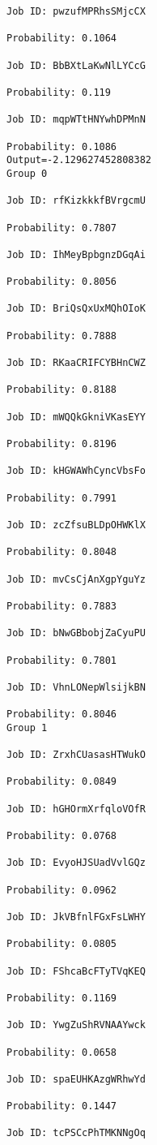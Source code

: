 \documentclass[11pt]{article}
\begin{document}
\begin{Verbatim}[commandchars=\\\{\}]
Job ID: pwzufMPRhsSMjcCX

Probability: 0.1064

Job ID: BbBXtLaKwNlLYCcG

Probability: 0.119

Job ID: mqpWTtHNYwhDPMnN

Probability: 0.1086
Output=-2.129627452808382
Group 0

Job ID: rfKizkkkfBVrgcmU

Probability: 0.7807

Job ID: IhMeyBpbgnzDGqAi

Probability: 0.8056

Job ID: BriQsQxUxMQhOIoK

Probability: 0.7888

Job ID: RKaaCRIFCYBHnCWZ

Probability: 0.8188

Job ID: mWQQkGkniVKasEYY

Probability: 0.8196

Job ID: kHGWAWhCyncVbsFo

Probability: 0.7991

Job ID: zcZfsuBLDpOHWKlX

Probability: 0.8048

Job ID: mvCsCjAnXgpYguYz

Probability: 0.7883

Job ID: bNwGBbobjZaCyuPU

Probability: 0.7801

Job ID: VhnLONepWlsijkBN

Probability: 0.8046
Group 1

Job ID: ZrxhCUasasHTWukO

Probability: 0.0849

Job ID: hGHOrmXrfqloVOfR

Probability: 0.0768

Job ID: EvyoHJSUadVvlGQz

Probability: 0.0962

Job ID: JkVBfnlFGxFsLWHY

Probability: 0.0805

Job ID: FShcaBcFTyTVqKEQ

Probability: 0.1169

Job ID: YwgZuShRVNAAYwck

Probability: 0.0658

Job ID: spaEUHKAzgWRhwYd

Probability: 0.1447

Job ID: tcPSCcPhTMKNNgOq


\end{Verbatim}
\end{document}

